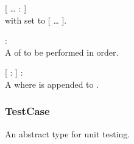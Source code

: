 \begin{dlist}
  \item {}[ \ldots {} :  ]\\
   with  set to [ \ldots {} ].
  
  \item {} : \\
  A  of  to be performed in order.
  
  \item {}[  :  ] : \\
  A  where  is appended to .
\end{dlist}

\subsubsection{TestCase}
An abstract type for unit testing.
